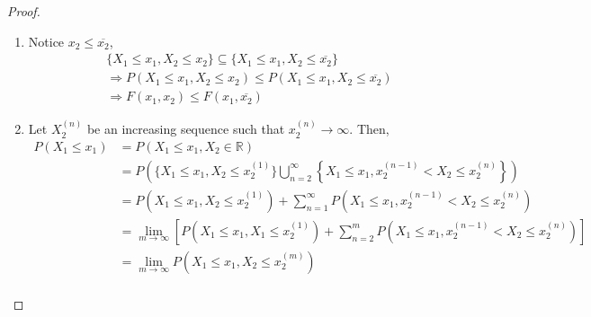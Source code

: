 \begin{proof}\quad                                                           \\
\begin{enumerate}[noitemsep, topsep=0em]
\item Notice $x_2 \leq \overline{x_2}$,
\begin{align*}
    &\lbrace X_1 \leq x_1, X_2 \leq x_2 \rbrace \subseteq
    \lbrace X_1 \leq x_1, X_2 \leq \overline{x_2} \rbrace                    \\
    &\Rightarrow
    P(X_1 \leq x_1, X_2 \leq x_2) \leq P(X_1 \leq x_1, X_2 \leq \overline{x_2})
                                                                             \\
    &\Rightarrow
    F(x_1, x_2) \leq F(x_1, \overline{x_2})
\end{align*}
\item Let $X_2^{(n)}$ be an increasing sequence such that $x_2^{(n)}
\rightarrow \infty$. Then,
\begin{align*}
    P(X_1 \leq x_1) &= P(X_1 \leq x_1, X_2 \in \mathbb{R})                   \\
                    &= P\left(
                         \lbrace X_1 \leq x_1, X_2 \leq x_2^{(1)} \rbrace
                         \bigcup_{n = 2}^\infty \left\lbrace
                             X_1 \leq x_1, x_2^{(n - 1)} < X_2 \leq x_2^{(n)}
                         \right\rbrace
                       \right)                                               \\
                    &= P(X_1 \leq x_1, X_2 \leq x_2^{(1)}) + 
                       \sum_{n = 1}^\infty P \left(
                           X_1 \leq x_1, x_2^{(n - 1)} < X_2 \leq x_2^{(n)}
                       \right)                                               \\
                    &= \lim_{m \rightarrow \infty} \left[
                            P(X_1 \leq x_1, X_1 \leq x_2^{(1)}) +
                            \sum_{n = 2}^m P \left(
                                X_1 \leq x_1, x_2^{(n - 1)} < X_2 \leq
                                              x_2^{(n)}
                            \right)
                       \right]                                               \\
                    &= \lim_{m \rightarrow \infty} P \left(
                           X_1 \leq x_1, X_2 \leq x_2^{(m)}
                       \right)                                               \\

\end{align*}
\end{enumerate}
\end{proof}
